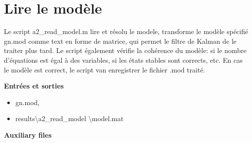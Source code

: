     \section{Lire le modèle}
    Le script {\color{magenta}a2\_read\_model.m} lire et résolu le modele, transforme le modèle spécifié {\color{magenta}gn.mod} comme text en forme de matrice, qui permet le filtre de Kalman de le traiter plus tard. Le script également vérifie la cohérence du modèle: si le nombre d'équations est égal à des variables, si les états stables sont corrects, etc. En cas le modèle est correct, le script van enregistrer le fichier .mod traité. 

    {\bf Entrées et sorties}
    \begin{itemize}
        \item[\textrightarrow] {\color{magenta} gn.mod},
        \item[\textleftarrow]  {\color{magenta}results\textbackslash a2\_read\_model \textbackslash model.mat}
    \end{itemize}
    {\bf Auxiliary files}
    